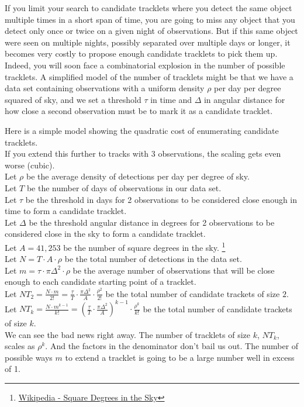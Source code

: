 If you limit your search to candidate tracklets where you detect the same object multiple times in a short span of time,
you are going to miss any object that you detect only once or twice on a given night of observations.
But if this same object were seen on multiple nights, possibly separated over multiple days or longer, 
it becomes very costly to propose enough candidate tracklets to pick them up.
Indeed, you will soon face a combinatorial explosion in the number of possible tracklets.
A simplified model of the number of tracklets might be that we have a data set containing 
observations with a uniform density $\rho$ per day per degree squared of sky,
and we set a threshold $\tau$ in time and $\Delta$ in angular distance for how close a second observation must be to mark it as a candidate tracklet.

Here is a simple model showing the quadratic cost of enumerating candidate tracklets. \\
If you extend this further to tracks with 3 observations, the scaling gets even worse (cubic).\\
Let $\rho$ be the average density of detections per day per degree of sky.\\
Let $T$ be the number of days of observations in our data set.\\
Let $\tau$ be the threshold in days for 2 observations to be considered close enough in time to form a candidate tracklet.\\
Let $\Delta$ be the threshold angular distance in degrees for 2 observations to be considered close in the sky to form a candidate tracklet.\\
Let $A = 41,253$ be the number of square degrees in the sky.
\footnote{\href{https://en.wikipedia.org/wiki/Square_degree}{Wikipedia - Square Degrees in the Sky}}\\
Let $N = T \cdot A \cdot \rho $ be the total number of detections in the data set.\\
Let $\displaystyle{m = \tau \cdot \pi \Delta^2 \cdot \rho}$ be the average number of observations that will be close enough
to each candidate starting point of a tracklet.\\
Let $\displaystyle{NT_{2} = \frac{N \cdot m}{2!} = \frac{\tau}{T} \cdot \frac{\pi \Delta^2}{A} \cdot \frac{\rho^{2}}{2!} }$ 
be the total number of candidate trackets of size $2$. \\
Let $\displaystyle{NT_{k} = \frac{N \cdot m^{k-1}}{k!} = \left( \frac{\tau}{T} \cdot \frac{\pi \Delta^2}{A} \right)^{k-1} \cdot \frac{\rho^{k}}{k!} }$ 
be the total number of candidate trackets of size $k$. \\
We can see the bad news right away.
The number of tracklets of size $k$, $NT_{k}$, scales as $\rho^{k}$.
And the factors in the denominator don't bail us out.  
The number of possible ways $m$ to extend a tracklet is going to be a large number well in excess of 1.

